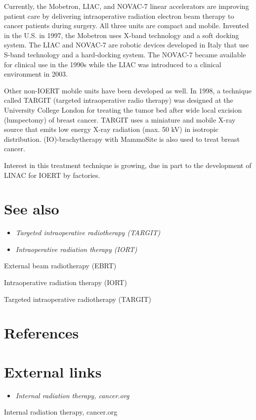 Currently, the Mobetron, LIAC, and NOVAC-7 linear accelerators are
improving patient care by delivering intraoperative radiation electron
beam therapy to cancer patients during surgery. All three units are
compact and mobile. Invented in the U.S. in 1997, the Mobetron uses
X-band technology and a soft docking system. The LIAC and NOVAC-7 are
robotic devices developed in Italy that use S-band technology and a
hard-docking system. The NOVAC-7 became available for clinical use in
the 1990s while the LIAC was introduced to a clinical environment in
2003.

Other non-IOERT mobile units have been developed as well. In 1998, a
technique called TARGIT (targeted intraoperative radio therapy) was
designed at the University College London for treating the tumor bed
after wide local excision (lumpectomy) of breast cancer. TARGIT uses a
miniature and mobile X-ray source that emits low energy X-ray radiation
(max. 50 kV) in isotropic distribution. (IO)-brachytherapy with
MammoSite is also used to treat breast cancer.

Interest in this treatment technique is growing, due in part to the
development of LINAC for IOERT by factories.

\section{See also}\label{see-also}

\begin{itemize}
\item
  \emph{Targeted intraoperative radiotherapy (TARGIT)}
\item
  \emph{Intraoperative radiation therapy (IORT)}
\end{itemize}

External beam radiotherapy (EBRT)

Intraoperative radiation therapy (IORT)

Targeted intraoperative radiotherapy (TARGIT)

\section{References}\label{references}

\section{External links}\label{external-links}

\begin{itemize}
\item
  \emph{Internal radiation therapy, cancer.org}
\end{itemize}

Internal radiation therapy, cancer.org
